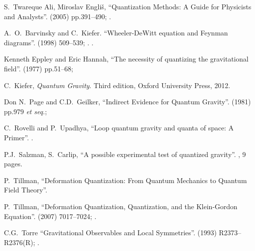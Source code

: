 \begin{thebibliography}{99}
S.~Twareque Ali, Miroslav Engli\v{s},
``Quantization Methods: A Guide for Physicists and Analysts''.
  (2005) pp.391--490;
.\\
{\tt{}}

A.~O.~Barvinsky and C.~Kiefer.
``Wheeler-DeWitt equation and Feynman diagrams''.
  (1998) 509--539; .\newline
{\tt{}}.

 Kenneth Eppley and Eric Hannah,
``The necessity of quantizing the gravitational field''.
  (1977) pp.51--68;
{\tt{}}

C.~Kiefer,
\textit{Quantum Gravity}.
Third edition, Oxford University Press, 2012.

 Don N.~Page and C.D.~Geilker,
``Indirect Evidence for Quantum Gravity''.
  (1981) pp.979 \emph{et seq.};
{\tt{}}

C.~Rovelli and P.~Upadhya,
``Loop quantum gravity and quanta of space: A Primer''.
.

 P.J.~Salzman, S.~Carlip,
``A possible experimental test of quantized gravity''. , 9 pages.

 P.~Tillman, ``Deformation Quantization: From Quantum Mechanics to
Quantum Field Theory''. 

 P.~Tillman, ``Deformation Quantization, Quantization, and the
Klein-Gordon Equation''.
  (2007) 7017--7024; .\\
{\tt{}}

C.G.~Torre
``Gravitational Observables and Local Symmetries''.
  (1993) R2373--R2376(R); .\newline
{\tt{}}


\end{thebibliography}
